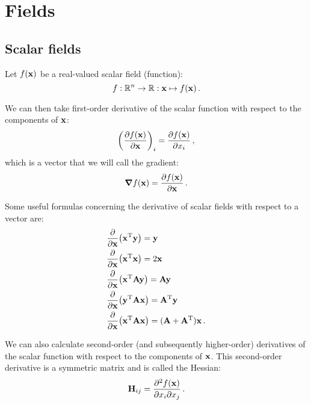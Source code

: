 \section{Fields}
    \subsection{Scalar fields}
        Let $f(\vb{x})$ be a real-valued scalar field (function):
        \begin{equation}
            f: \mathbb{R}^n \rightarrow \mathbb{R}: \vb{x} \mapsto f(\vb{x}) \thinspace .
        \end{equation}

        We can then take first-order derivative of the scalar function with respect to the components of $\vb{x}$:
        \begin{equation}
            \qty(\pdv{f(\vb{x})}{\vb{x}})_i = \pdv{f(\vb{x})}{x_i} \thinspace ,
        \end{equation}
        which is a vector that we will call the gradient:
        \begin{equation}
            \grad{f(\vb{x})} = \pdv{f(\vb{x})}{\vb{x}} \thinspace .
        \end{equation}

        Some useful formulas concerning the derivative of scalar fields with respect to a vector are:
        \begin{align}
            & \pdv{\vb{x}} (\vb{x}^\text{T} \vb{y}) = \vb{y} \\
            & \pdv{\vb{x}} (\vb{x}^\text{T} \vb{x}) = 2 \vb{x} \\
            & \pdv{\vb{x}} (\vb{x}^\text{T} \vb{A} \vb{y}) = \vb{A} \vb{y} \\
            & \pdv{\vb{x}} (\vb{y}^\text{T} \vb{A} \vb{x}) = \vb{A}^\text{T} \vb{y} \\
            & \pdv{\vb{x}} (\vb{x}^\text{T} \vb{A} \vb{x}) = (\vb{A} + \vb{A}^\text{T}) \vb{x} \thinspace .
        \end{align}

        We can also calculate second-order (and subsequently higher-order) derivatives of the scalar function with respect to the components of $\vb{x}$. This second-order derivative is a symmetric matrix and is called the Hessian:
        \begin{equation}
            \vb{H}_{ij} = \pdv{f(\vb{x})}{x_i}{x_j} \thinspace .
        \end{equation}

